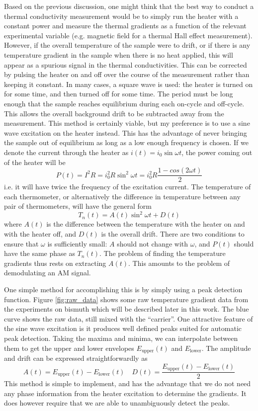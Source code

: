\documentclass{thesis-umich}
\begin{document}
Based on the previous discussion, one might think that the best way to conduct a thermal conductivity measurement would be to simply run the heater with a constant power and measure the thermal gradients as a function of the relevant experimental variable (e.g. magnetic field for a thermal Hall effect measurement). However, if the overall temperature of the sample were to drift, or if there is any temperature gradient in the sample when there is no heat applied, this will appear as a spurious signal in the thermal conductivities. This can be corrected by pulsing the heater on and off over the course of the measurement rather than keeping it constant. In many cases, a square wave is used: the heater is turned on for some time, and then turned off for some time. The period must be long enough that the sample reaches equilibrium during each on-cycle and off-cycle. This allows the overall background drift to be subtracted away from the measurement. This method is certainly viable, but my preference is to use a sine wave excitation on the heater instead. This has the advantage of never bringing the sample out of equilibrium as long as a low enough frequency is chosen. If we denote the current through the heater as $i(t) = i_0 \sin \omega t$, the power coming out of the heater will be
\[P(t) = I^2R = i_0^2R \sin^2 \omega t = i_0^2 R \frac{1 - cos(2\omega t)}{2} \]
i.e. it will have twice the frequency of the excitation current. The temperature of each thermometer, or alternatively the difference in temperature between any pair of thermometers, will have the general form
\[ T_n(t) = A(t)\sin^2 \omega t + D(t) \]
where $A(t)$ is the difference between the temperature with the heater on and with the heater off, and $D(t)$ is the overall drift. There are two conditions to ensure that $\omega$ is sufficiently small: $A$ should not change with $\omega$, and $P(t)$ should have the same phase as $T_n(t)$. The problem of finding the temperature gradients thus rests on extracting $A(t)$. This amounts to the problem of demodulating an AM signal.

One simple method for accomplishing this is by simply using a peak detection function. Figure \ref{fig:raw_data} shows some raw temperature gradient data from the experiments on bismuth which will be described later in this work. The blue curve shows the raw data, still mixed with the ``carrier''. One attractive feature of the sine wave excitation is it produces well defined peaks suited for automatic peak detection. Taking the maxima and minima, we can interpolate between them to get the upper and lower envelopes $E_{\mathrm{upper}}(t)$ and $E_{\mathrm{lower}}$. The amplitude and drift can be expressed straightforwardly as
\[ A(t) = E_{\mathrm{upper}}(t) - E_{\mathrm{lower}}(t) \quad D(t) = \frac{E_{\mathrm{upper}}(t) - E_{\mathrm{lower}}(t)}{2} \]
This method is simple to implement, and has the advantage that we do not need any phase information from the heater excitation to determine the gradients. It does however require that we are able to unambiguously detect the peaks.
\end{document}

